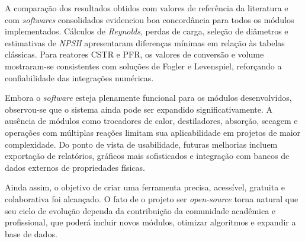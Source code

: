 A comparação dos resultados obtidos com valores de referência da literatura e com \textit{softwares} consolidados evidenciou boa concordância para todos os módulos implementados. Cálculos de \textit{Reynolds}, perdas de carga, seleção de diâmetros e estimativas de \textit{NPSH} apresentaram diferenças mínimas em relação às tabelas clássicas. Para reatores CSTR e PFR, os valores de conversão e volume mostraram-se consistentes com soluções de Fogler e Levenspiel, reforçando a confiabilidade das integrações numéricas.

Embora o \textit{software} esteja plenamente funcional para os módulos desenvolvidos, observou-se que o sistema ainda pode ser expandido significativamente. A ausência de módulos como trocadores de calor, destiladores, absorção, secagem e operações com múltiplas reações limitam sua aplicabilidade em projetos de maior complexidade. Do ponto de vista de usabilidade, futuras melhorias incluem exportação de relatórios, gráficos mais sofisticados e integração com bancos de dados externos de propriedades físicas.

Ainda assim, o objetivo de criar uma ferramenta precisa, acessível, gratuita e colaborativa foi alcançado. O fato de o projeto ser \textit{open-source} torna natural que seu ciclo de evolução dependa da contribuição da comunidade acadêmica e profissional, que poderá incluir novos módulos, otimizar algoritmos e expandir a base de dados.
